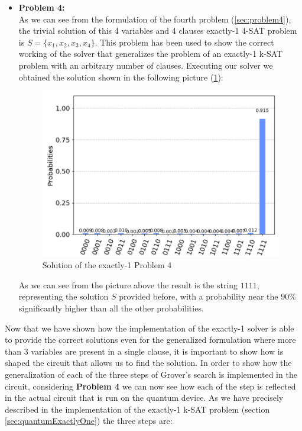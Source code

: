 \documentclass[english]{article}
\begin{document}
\begin{itemize}
					\item \textbf{Problem 4:} \\
						As we can see from the formulation of the fourth problem (\ref{sec:problem4}), the trivial solution of this 4 variables and 4 clauses exactly-1 4-SAT problem is $S=\{x_1, x_2, x_3, x_4\}$. This problem has been used to show the correct working of the solver that generalizes the problem of an exactly-1 k-SAT problem with an arbitrary number of clauses. Executing our solver we obtained the solution shown in the following picture (\ref{fig:problem4Solution}):
						\begin{figure}[h]
							\centering
							\includegraphics[scale=0.42]{Problem_4_Solution.png}
							\caption{
								\label{fig:problem4Solution}
								Solution of the exactly-1 Problem 4
							}
						\end{figure}
					
						As we can see from the picture above the result is the string $1111$, representing the solution $S$ provided before, with a probability near the $90\%$ significantly higher than all the other probabilities. 
				\end{itemize}
				Now that we have shown how the implementation of the exactly-1 solver is able to provide the correct solutions even for the generalized formulation where more than 3 variables are present in a single clause, it is important to show how is shaped the circuit that allows us to find the solution. In order to show how the generalization of each of the three steps of Grover's search is implemented in the circuit, considering \textbf{Problem 4} we can now see how each of the step is reflected in the actual circuit that is run on the quantum device. As we have precisely described in the implementation of the exactly-1 k-SAT problem (section \ref{sec:quantumExactlyOne}) the three steps are:
\end{document}
